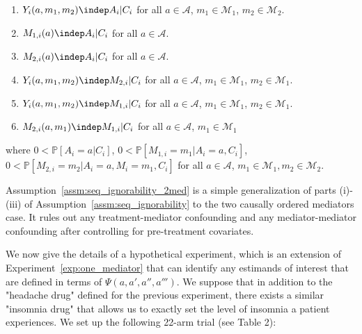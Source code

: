\begin{assumption}\label{assm:seq_ignorability_2med} 
\indent
\begin{enumerate}[noitemsep,topsep=0pt,label=(\roman*)]
	\item $Y_{i}(a,m_{1},m_{2}) \indep A_{i} | C_{i}$ for all 
	$a \in \mathcal{A}$, $m_{1} \in \mathcal{M}_{1}$, $m_{2} \in \mathcal{M}_{2}$. 
	\item $M_{1,i}(a) \indep A_{i} | C_{i}$ for all $a \in \mathcal{A}$. 
	\item $M_{2,i}(a) \indep A_{i} | C_{i}$ for all $a \in \mathcal{A}$. 
	\item $Y_{i}(a,m_{1},m_{2}) \indep M_{2,i} | C_{i}$ 
	for all $a \in \mathcal{A}$, $m_{1} \in \mathcal{M}_{1}$, $m_{2} \in \mathcal{M}_{1}$. 
	\item $Y_{i}(a,m_{1},m_{2}) \indep M_{1,i} | C_{i}$ 
	for all $a \in \mathcal{A}$, $m_{1} \in \mathcal{M}_{1}$, $m_{2} \in \mathcal{M}_{1}$. 
	\item $M_{2,i}(a,m_{1}) \indep M_{1,i} | C_{i}$ 
	for all $a \in \mathcal{A}$, $m_{1} \in \mathcal{M}_{1}$
\end{enumerate}
where $0 < \mathbb{P}[A_{i} = a | C_{i}]$, $0 < \mathbb{P}[M_{1,i} = m_{1} | A_{i} = a, C_{i}]$,
$0 < \mathbb{P}[M_{2,i} = m_{2} | A_{i} = a, M_{i} = m_{1}, C_{i}]$
for all $a \in \mathcal{A}$, $m_{1} \in \mathcal{M}_{1}, m_{2} \in \mathcal{M}_{2}$. 
\end{assumption}

Assumption~\ref{assm:seq_ignorability_2med} is a simple generalization of parts (i)-(iii) of 
Assumption~\ref{assm:seq_ignorability} to the two causally ordered mediators case. It rules out
any treatment-mediator confounding and any mediator-mediator confounding after controlling for 
pre-treatment covariates. 

We now give the details of a hypothetical experiment, which is an extension of Experiment~\ref{exp:one_mediator} 
that can identify any estimands of interest that are defined in terms of $\Psi(a,a',a'',a''')$. 
We suppose that in addition to the "headache drug" defined for the previous experiment, there 
exists a similar "insomnia drug" that allows us to exactly set the level of insomnia a patient
experiences. We set up the following 22-arm trial (see Table 2):  


